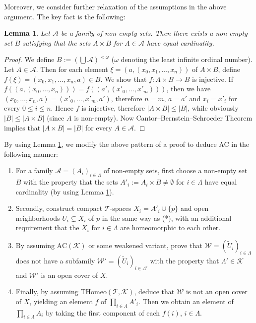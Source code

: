 \documentclass{article}
\newtheorem{lemma}{Lemma}
\begin{document}
Moreover, we consider further relaxation of the assumptions in the above argument.
The key fact is the following:
\begin{lemma}
\label{lem:product_of_equal_cardinality}
Let $\mathcal{A}$ be a family of non-empty sets.
Then there exists a non-empty set $B$ satisfying that the sets $A \times B$ for $A \in \mathcal{A}$ have equal cardinality.
\end{lemma}
\begin{proof}
We define $B := (\bigcup \mathcal{A})^{< \omega}$ ($\omega$ denoting the least infinite ordinal number).
Let $A \in \mathcal{A}$.
Then for each element $\xi = (a,(x_0,x_1,\dots,x_n))$ of $A \times B$, define $f(\xi) = (x_0,x_1,\dots,x_n,a) \in B$.
We show that $f \colon A \times B \to B$ is injective.
If $f((a,(x_0,\dots,x_n))) = f((a',(x'_0,\dots,x'_m)))$, then we have $(x_0,\dots,x_n,a) = (x'_0,\dots,x'_m,a')$, therefore $n = m$, $a = a'$ and $x_i = x'_i$ for every $0 \leq i \leq n$.
Hence $f$ is injective, therefore $|A \times B| \leq |B|$, while obviously $|B| \leq |A \times B|$ (since $A$ is non-empty).
Now Cantor--Bernstein--Schroeder Theorem implies that $|A \times B| = |B|$ for every $A \in \mathcal{A}$.
\end{proof}
By using Lemma \ref{lem:product_of_equal_cardinality}, we modify the above pattern of a proof to deduce AC in the following manner:
\begin{enumerate}
\item For a family $\mathcal{A} = (A_i)_{i \in \Lambda}$ of non-empty sets, first choose a non-empty set $B$ with the property that the sets $A'_i := A_i \times B \neq \emptyset$ for $i \in \Lambda$ have equal cardinality (by using Lemma \ref{lem:product_of_equal_cardinality}).
\item Secondly, construct compact $\mathcal{T}$-spaces $X_i = A'_i \cup \{p\}$ and open neighborhoods $U_i \subsetneq X_i$ of $p$ in the same way as (*), with an additional requirement that the $X_i$ for $i \in \Lambda$ are homeomorphic to each other.
\item By assuming $\mathrm{AC}(\mathcal{K})$ or some weakened variant, prove that $\mathcal{W} = (\widetilde{U}_i)_{i \in \Lambda}$ does not have a subfamily $\mathcal{W}' = (\widetilde{U}_i)_{i \in \Lambda'}$ with the property that $\Lambda' \in \mathcal{K}$ and $\mathcal{W}'$ is an open cover of $X$.
\item Finally, by assuming $\mathrm{THomeo}(\mathcal{T},\mathcal{K})$, deduce that $\mathcal{W}$ is not an open cover of $X$, yielding an element $f$ of $\prod_{i \in \Lambda} A'_i$.
Then we obtain an element of $\prod_{i \in \Lambda} A_i$ by taking the first component of each $f(i)$, $i \in \Lambda$.
\end{enumerate}
\end{document}

